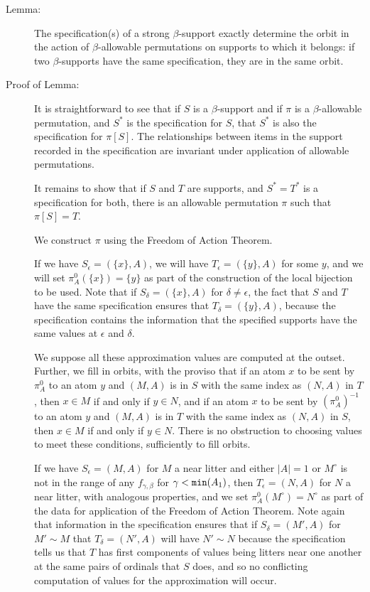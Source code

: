 \documentclass[112pt]{article}
\begin{document}
\begin{description}
\item[Lemma:]  The specification(s) of a strong $\beta$-support exactly determine the orbit in the action of $\beta$-allowable permutations on supports to which it belongs:  if two $\beta$-supports have the same specification, they are in the same orbit.

\item[Proof of Lemma:]

It is straightforward to see that if $S$ is a $\beta$-support and if $\pi$ is a $\beta$-allowable permutation, and $S^*$ is the  specification for $S$, that $S^*$ is also the specification for $\pi[S]$.  The relationships between items in the support recorded in the specification are invariant under application of allowable permutations.

It remains to show that if $S$ and $T$ are supports, and $S^*=T^*$ is a specification for both, there is an allowable permutation $\pi$ such that $\pi[S]=T$.  

We construct $\pi$ using the Freedom of Action Theorem.

If we have $S_\epsilon = (\{x\},A)$, we will have $T_\epsilon = (\{y\},A)$ for some $y$, and we will set $\pi^0_A(\{x\}) = \{y\}$ as part of the construction of the local bijection to be used.     Note that if $S_\delta = (\{x\},A)$ for $\delta \neq \epsilon$, the fact that $S$ and
$T$ have the same specification ensures that $T_\delta = (\{y\},A)$, because the specification contains the information that the specified supports have the same values at $\epsilon$ and $\delta$.

We suppose all these approximation values are computed at the outset.  Further, we fill in orbits,
with the proviso that if an atom $x$  to be sent by $\pi^0_A$ to an atom $y$ and $(M,A)$ is in $S$ with the same index as $(N,A)$ in $T$, then $x \in M$ if and only if $y \in N$,   and if an atom $x$  to be sent by $(\pi^0_A)^{-1}$ to an atom $y$ and $(M,A)$ is in $T$ with the same index as $(N,A)$ in $S$, then $x \in M$ if and only if $y \in N$.  There is no obstruction to choosing values to meet these conditions, sufficiently to fill orbits.

If we have $S_\epsilon = (M,A)$ for $M$ a near litter and either $|A|=1$ or $M^\circ$ is not in the range of any $f_{\gamma,\beta}$ for $\gamma<{\tt min}(A_1)$, then $T_\epsilon = (N,A)$ for $N$ a near litter, with analogous properties, and we set $\pi^0_A(M^\circ) = N^\circ$  as part of the data for application of the Freedom of Action Theorem.    Note again
that information in the specification ensures that if $S_\delta = (M',A)$  for $M'\sim M$ that
$T_\delta = (N',A)$ will have $N' \sim N$ because the specification tells us that $T$ has first components of values being litters near one another at the same pairs of ordinals that $S$ does,
and so no conflicting computation of values for the approximation will occur.


\end{description}
\end{document}
